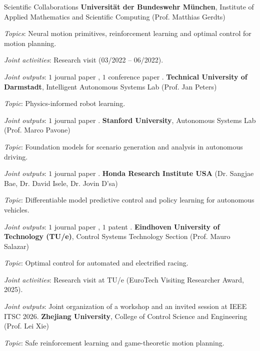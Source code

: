 \begin{rubric}{Scientific Collaborations}
%
%
\entry*[Germany]%
	\textbf{Universit{\"a}t der Bundeswehr M{\"u}nchen}, Institute of Applied Mathematics and Scientific Computing (Prof. Matthias Gerdts)
    \par \textit{Topics}: Neural motion primitives, reinforcement learning and optimal control for motion planning.
    \par \textit{Joint activities}: Research visit (03/2022 -- 06/2022).
    \par \textit{Joint outputs}: $1$ journal paper \cite{Piccinini2024PathPolyNN}, $1$ conference paper \cite{Gottschalk2024}.
%
\entry*[Germany]%
	\textbf{Technical University of Darmstadt}, Intelligent Autonomous Systems Lab (Prof. Jan Peters)
    \par \textit{Topic}: Physics-informed robot learning.
    \par \textit{Joint outputs}: $1$ journal paper \cite{piccinini2026physicspriors}.
%
\entry*[USA]%
	\textbf{Stanford University}, Autonomous Systems Lab (Prof. Marco Pavone)
    \par \textit{Topic}: Foundation models for scenario generation and analysis in autonomous driving.
    \par \textit{Joint outputs}: $1$ journal paper \cite{Gao2025survey}.
%
\entry*[USA]%
	\textbf{Honda Research Institute USA} (Dr. Sangjae Bae, Dr. David Isele, Dr. Jovin D'sa)
    \par \textit{Topic}: Differentiable model predictive control and policy learning for autonomous vehicles.
    \par \textit{Joint outputs}: $1$ journal paper \cite{Jahncke2025_diffMPC}, $1$ patent \cite{Honda2026_patent}.
%
\entry*[Netherlands]%
	\textbf{Eindhoven University of Technology (TU/e)}, Control Systems Technology Section (Prof. Mauro Salazar)
    \par \textit{Topic}: Optimal control for automated and electrified racing.
    \par \textit{Joint activities}: Research visit at TU/e (EuroTech Visiting Researcher Award, 2025).
    \par \textit{Joint outputs}: Joint organization of a workshop and an invited session at IEEE ITSC 2026.
%
\entry*[China]%
	\textbf{Zhejiang University}, College of Control Science and Engineering (Prof. Lei Xie)
    \par \textit{Topic}: Safe reinforcement learning and game-theoretic motion planning.

\end{rubric}
